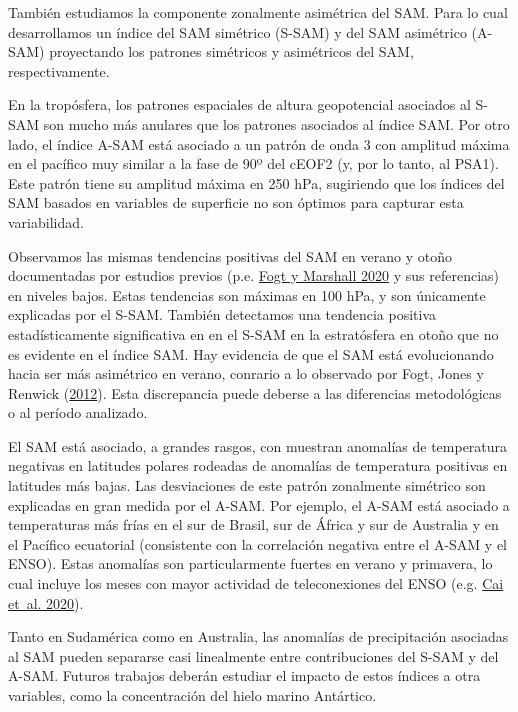 \documentclass[12pt,oneside,a4paper]{reedthesis}
\begin{document}
También estudiamos la componente zonalmente asimétrica del SAM.
Para lo cual desarrollamos un índice del SAM simétrico (S-SAM) y del SAM asimétrico (A-SAM) proyectando los patrones simétricos y asimétricos del SAM, respectivamente.

En la tropósfera, los patrones espaciales de altura geopotencial asociados al S-SAM son mucho más anulares que los patrones asociados al índice SAM.
Por otro lado, el índice A-SAM está asociado a un patrón de onda 3 con amplitud máxima en el pacífico muy similar a la fase de 90º del cEOF2 (y, por lo tanto, al PSA1).
Este patrón tiene su amplitud máxima en 250 hPa, sugiriendo que los índices del SAM basados en variables de superficie no son óptimos para capturar esta variabilidad.

Observamos las mismas tendencias positivas del SAM en verano y otoño documentadas por estudios previos (p.e. \protect\hyperlink{ref-fogt2020}{Fogt y Marshall 2020} y sus referencias) en niveles bajos.
Estas tendencias son máximas en 100 hPa, y son únicamente explicadas por el S-SAM.
También detectamos una tendencia positiva estadísticamente significativa en en el S-SAM en la estratósfera en otoño que no es evidente en el índice SAM.
Hay evidencia de que el SAM está evolucionando hacia ser más asimétrico en verano, conrario a lo observado por Fogt, Jones y Renwick (\protect\hyperlink{ref-fogt2012}{2012}).
Esta discrepancia puede deberse a las diferencias metodológicas o al período analizado.

El SAM está asociado, a grandes rasgos, con muestran anomalías de temperatura negativas en latitudes polares rodeadas de anomalías de temperatura positivas en latitudes más bajas.
Las desviaciones de este patrón zonalmente simétrico son explicadas en gran medida por el A-SAM.
Por ejemplo, el A-SAM está asociado a temperaturas más frías en el sur de Brasil, sur de África y sur de Australia y en el Pacífico ecuatorial (consistente con la correlación negativa entre el A-SAM y el ENSO).
Estas anomalías son particularmente fuertes en verano y primavera, lo cual incluye los meses con mayor actividad de teleconexiones del ENSO (e.g. \protect\hyperlink{ref-cai2020a}{Cai et~al. 2020}).

Tanto en Sudamérica como en Australia, las anomalías de precipitación asociadas al SAM pueden separarse casi linealmente entre contribuciones del S-SAM y del A-SAM.
Futuros trabajos deberán estudiar el impacto de estos índices a otra variables, como la concentración del hielo marino Antártico.
\end{document}
